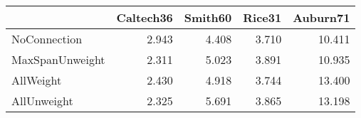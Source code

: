 \begin{tabular}{lrrrr}
\toprule
{} & Caltech36 & Smith60 & Rice31 & Auburn71 \\
\midrule
NoConnection    &     2.943 &   4.408 &  3.710 &   10.411 \\
MaxSpanUnweight &     2.311 &   5.023 &  3.891 &   10.935 \\
AllWeight       &     2.430 &   4.918 &  3.744 &   13.400 \\
AllUnweight     &     2.325 &   5.691 &  3.865 &   13.198 \\
\bottomrule
\end{tabular}
